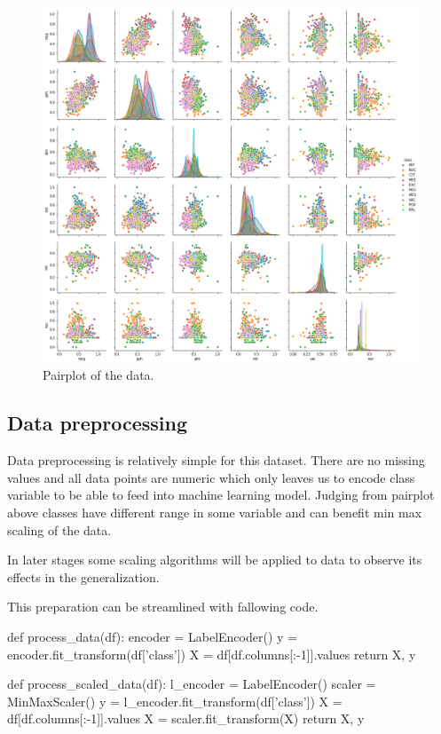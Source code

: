\documentclass[12pt]{article}
\begin{document}
\begin{figure}[H] \label{fig:pairplot}
    \centering
    \includegraphics[width=\textwidth]{img/pairplot.png}
    \caption{Pairplot of the data.}
\end{figure}

\subsection{Data preprocessing} \label{subsec:preprocess}
Data preprocessing is relatively simple for this dataset. There are no missing values and all data points are numeric which only leaves us to encode class variable to be able to feed into machine learning model. Judging from pairplot above classes have different range in some variable and can benefit min max scaling of the data. 

In later stages some scaling algorithms will be applied to data to observe its effects in the generalization.

This preparation can be streamlined with fallowing code.

\begin{python}
    def process_data(df):
        encoder = LabelEncoder()
        y = encoder.fit_transform(df['class'])
        X = df[df.columns[:-1]].values
        return X, y

    def process_scaled_data(df):
        l_encoder = LabelEncoder()
        scaler = MinMaxScaler()
        y = l_encoder.fit_transform(df['class'])
        X = df[df.columns[:-1]].values
        X = scaler.fit_transform(X)
        return X, y
\end{python}
\end{document}
